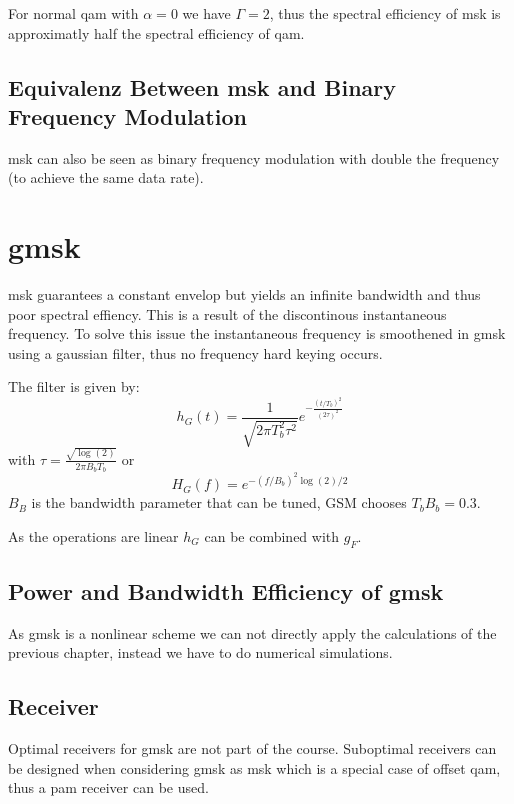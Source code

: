 For normal \ac{qam} with $\alpha=0$ we have $\Gamma = 2$, thus the spectral efficiency of
\ac{msk} is approximatly half the spectral efficiency of \ac{qam}. 

\subsection{Equivalenz Between \acl{msk} and Binary Frequency Modulation}
\ac{msk} can also be seen as binary frequency modulation with double the frequency
(to achieve the same data rate).

\section{\acl{gmsk}}
\ac{msk} guarantees a constant envelop but yields an infinite bandwidth and thus poor
spectral effiency. This is a result of the discontinous instantaneous frequency.
To solve this issue the instantaneous frequency is smoothened in
\ac{gmsk} using a gaussian filter, thus no frequency hard keying occurs.

The filter is given by:
\begin{equation}
    h_G(t) = \frac{1}{\sqrt{2 \pi T_b^2 \tau^2}} e^{-\frac{(t/T_b)^2}{(2\tau)^2}}
\end{equation}
with $\tau = \frac{\sqrt{\log(2)}}{2 \pi B_b T_b}$ or
\begin{equation}
    H_G(f) = e^{-(f/B_b)^2 \log(2) /2}
\end{equation}
$B_B$ is the bandwidth parameter that can be tuned, GSM chooses $T_b B_b = 0.3$.

As the operations are linear $h_G$ can be combined with $g_F$.

\subsection{Power and Bandwidth Efficiency of \acl{gmsk}}
As \ac{gmsk} is a nonlinear scheme we can not directly apply the calculations of the
previous chapter, instead we have to do numerical simulations.

\subsection{Receiver}
Optimal receivers for \ac{gmsk} are not part of the course. Suboptimal receivers can be
designed when considering \ac{gmsk} as \ac{msk} which is a special case of offset
\ac{qam}, thus a \ac{pam} receiver can be used.

